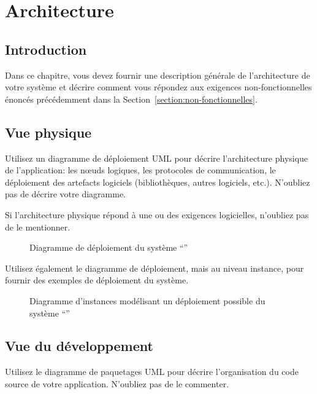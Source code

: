
\chapter{Architecture}

\section{Introduction}
	Dans ce chapitre, vous devez fournir une description générale de l'architecture de votre système et décrire comment vous répondez aux exigences non-fonctionnelles énoncés précédemment dans la Section~\ref{section:non-fonctionnelles}.


\section{Vue physique}

Utilisez un diagramme de déploiement UML pour décrire l'architecture physique de l'application: les nœuds logiques, les protocoles de communication, le déploiement des artefacts logiciels (bibliothèques, autres logiciels, etc.).
N'oubliez pas de décrire votre diagramme.

Si l'architecture physique répond à une ou des exigences logicielles, n'oubliez pas de le mentionner.

\begin{figure}[!htbp]
\begin{center}

\caption{Diagramme de déploiement du système ``\projet{}''}
\end{center}
\end{figure} 

Utilisez également le diagramme de déploiement, mais au niveau instance, pour fournir des exemples de déploiement du système.

\begin{figure}[!htbp]
\begin{center}

\caption{Diagramme d'instances modélisant un déploiement possible du système ``\projet{}''}
\end{center}
\end{figure} 


\section{Vue du développement}
Utilisez le diagramme de paquetages UML pour décrire l'organisation du code source de votre application.
N'oubliez pas de le commenter.

